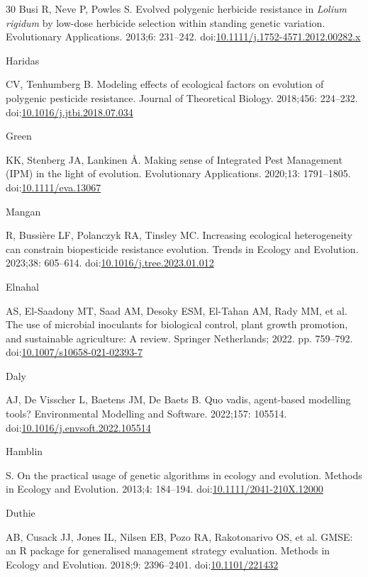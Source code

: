 \documentclass[10pt,letterpaper]{article}
\begin{document}
\begin{thebibliography}{30}
\hypertarget{ref-Busi2013}{Busi} R, Neve P, Powles S. {Evolved polygenic herbicide resistance in \textit{Lolium rigidum} by low-dose herbicide selection within standing genetic variation}. Evolutionary Applications. 2013;6: 231--242. doi:\href{https://doi.org/10.1111/j.1752-4571.2012.00282.x}{10.1111/j.1752-4571.2012.00282.x}

\hypertarget{ref-Haridas2018}{Haridas} CV, Tenhumberg B. {Modeling effects of ecological factors on evolution of polygenic pesticide resistance}. Journal of Theoretical Biology. 2018;456: 224--232. doi:\href{https://doi.org/10.1016/j.jtbi.2018.07.034}{10.1016/j.jtbi.2018.07.034}

\hypertarget{ref-Green2020}{Green} KK, Stenberg JA, Lankinen Å. {Making sense of Integrated Pest Management (IPM) in the light of evolution}. Evolutionary Applications. 2020;13: 1791--1805. doi:\href{https://doi.org/10.1111/eva.13067}{10.1111/eva.13067}

\hypertarget{ref-Mangan2023}{Mangan} R, Bussière LF, Polanczyk RA, Tinsley MC. {Increasing ecological heterogeneity can constrain biopesticide resistance evolution}. Trends in Ecology and Evolution. 2023;38: 605--614. doi:\href{https://doi.org/10.1016/j.tree.2023.01.012}{10.1016/j.tree.2023.01.012}

\hypertarget{ref-Elnahal2022}{Elnahal} AS, El-Saadony MT, Saad AM, Desoky ESM, El-Tahan AM, Rady MM, et al. {The use of microbial inoculants for biological control, plant growth promotion, and sustainable agriculture: A review}. Springer Netherlands; 2022. pp. 759--792. doi:\href{https://doi.org/10.1007/s10658-021-02393-7}{10.1007/s10658-021-02393-7}

\hypertarget{ref-Daly2022}{Daly} AJ, De Visscher L, Baetens JM, De Baets B. {Quo vadis, agent-based modelling tools?} Environmental Modelling and Software. 2022;157: 105514. doi:\href{https://doi.org/10.1016/j.envsoft.2022.105514}{10.1016/j.envsoft.2022.105514}

\hypertarget{ref-Hamblin2013}{Hamblin} S. {On the practical usage of genetic algorithms in ecology and evolution}. Methods in Ecology and Evolution. 2013;4: 184--194. doi:\href{https://doi.org/10.1111/2041-210X.12000}{10.1111/2041-210X.12000}

\hypertarget{ref-Duthie2018}{Duthie} AB, Cusack JJ, Jones IL, Nilsen EB, Pozo RA, Rakotonarivo OS, et al. {GMSE: an R package for generalised management strategy evaluation}. Methods in Ecology and Evolution. 2018;9: 2396--2401. doi:\href{https://doi.org/10.1101/221432}{10.1101/221432}


\end{thebibliography}
\end{document}
